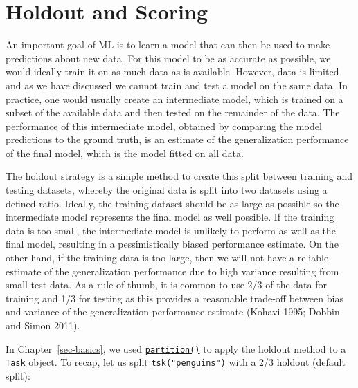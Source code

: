 \hypertarget{sec-holdout-scoring}{%
\section{Holdout and Scoring}\label{sec-holdout-scoring}}

An important goal of ML is to learn a model that can then be used to
make predictions about new data. For this model to be as accurate as
possible, we would ideally train it on as much data as is available.
However, data is limited and as we have discussed we cannot train and
test a model on the same data. In practice, one would usually create an
intermediate
model, which is trained on a subset of the available
data and then tested on the remainder of the data. The performance of
this intermediate model, obtained by comparing the model predictions to
the ground truth, is an estimate of the generalization performance of
the final model, which is the model fitted on all data.

The
holdout
strategy is a simple method to create this split between training and
testing datasets, whereby the original data is split into two datasets
using a defined ratio. Ideally, the training dataset should be as large
as possible so the intermediate model represents the final model as well
possible. If the training data is too small, the intermediate model is
unlikely to perform as well as the final model, resulting in a
pessimistically biased performance estimate. On the other hand, if the
training data is too large, then we will not have a reliable estimate of
the generalization performance due to high variance resulting from small
test data. As a rule of thumb, it is common to use 2/3 of the data for
training and 1/3 for testing as this provides a reasonable trade-off
between bias and variance of the generalization performance estimate
(Kohavi 1995; Dobbin and Simon 2011).

In Chapter~\ref{sec-basics}, we used
\href{https://mlr3.mlr-org.com/reference/partition.html}{\texttt{partition()}}
to apply the holdout method to a
\href{https://mlr3.mlr-org.com/reference/Task.html}{\texttt{Task}}
object. To recap, let us split \texttt{tsk("penguins")} with a 2/3
holdout (default split):

